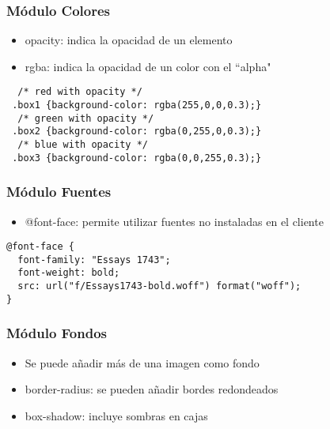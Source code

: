 
\begin{frame}[fragile]
\frametitle{Módulo Colores}

\begin{itemize}
  \item opacity: indica la opacidad de un elemento
  \item rgba: indica la opacidad de un color con el ``alpha"
\end{itemize}

\begin{footnotesize}
\begin{verbatim}
  /* red with opacity */
 .box1 {background-color: rgba(255,0,0,0.3);}  
  /* green with opacity */
 .box2 {background-color: rgba(0,255,0,0.3);}  
  /* blue with opacity */
 .box3 {background-color: rgba(0,0,255,0.3);}  
\end{verbatim}
\end{footnotesize}

\end{frame}



\begin{frame}[fragile]
\frametitle{Módulo Fuentes}

\begin{itemize}
  \item @font-face: permite utilizar fuentes no instaladas en el cliente
\end{itemize}

\begin{footnotesize}
\begin{verbatim}
@font-face {
  font-family: "Essays 1743";
  font-weight: bold;
  src: url("f/Essays1743-bold.woff") format("woff");
}
\end{verbatim}
\end{footnotesize}

\end{frame}



\begin{frame}
\frametitle{Módulo Fondos}

\begin{itemize}
  \item Se puede añadir más de una imagen como fondo
  \item border-radius: se pueden añadir bordes redondeados
  \item box-shadow: incluye sombras en cajas
\end{itemize}

\end{frame}

